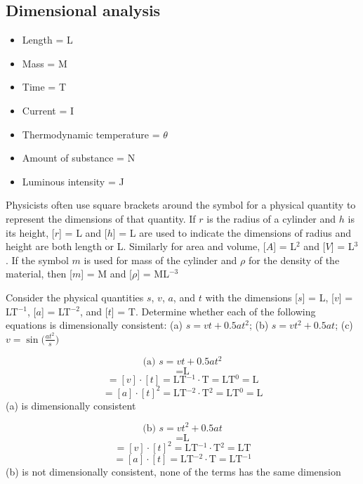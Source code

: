 \documentclass[a4paper]{article}
\begin{document}
    \subsection{Dimensional analysis}

    \begin{itemize}
        \item Length = L
        \item Mass = M
        \item Time = T
        \item Current = I
        \item Thermodynamic temperature = $\theta$
        \item Amount of substance = N
        \item Luminous intensity = J
    \end{itemize}
    Physicists often use square brackets around the symbol for a physical quantity to represent the dimensions of that quantity. If $r$ is the radius of a cylinder and $h$ is its height, [$r$] = L and [$h$] = L are used to indicate the dimensions of radius and height are both length or L. Similarly for area and volume, [$A$] = L$^2$ and [$V$] = L$^3$. If the symbol $m$ is used for mass of the cylinder and $\rho$ for the density of the material, then [$m$] = M and [$\rho$] = ML$^{-3}$

    Consider the physical quantities $s$, $v$, $a$, and $t$ with the dimensions [$s$] = L, [$v$] = LT$^{-1}$, [$a$] = LT$^{-2}$, and [$t$] = T. Determine whether each of the following equations is dimensionally consistent: (a) $s = vt + 0.5at^2$; (b) $s = vt^2 + 0.5at$; (c) $v = \sin\big(\frac{at^2}{s}\big)$

    \begin{equation}
        \text{(a) } s = vt + 0.5at^2
    \end{equation}
    \begin{equation}
        [s] = \text{L}
    \end{equation}
    \begin{equation}
        [vt] = [v] \cdot [t] = \text{LT$^{-1}$} \cdot \text{T} = \text{LT$^0$} = \text{L}
    \end{equation}
    \begin{equation}
        [0.5at^2] = [a] \cdot [t]^2 = \text{LT$^{-2}$} \cdot \text{T$^2$} = \text{LT$^0$} = \text{L}
    \end{equation}
    (a) is dimensionally consistent

    \begin{equation}
        \text{(b) } s = vt^2 + 0.5at
    \end{equation}
    \begin{equation}
        [s] = \text{L}
    \end{equation}
    \begin{equation}
        [vt^2] = [v] \cdot [t]^2 = \text{LT$^{-1}$} \cdot \text{T$^2$} = \text{LT}
    \end{equation}
    \begin{equation}
        [0.5at] = [a] \cdot [t] = \text{LT$^{-2}$} \cdot \text{T} = \text{LT$^{-1}$}
    \end{equation}
    (b) is not dimensionally consistent, none of the terms has the same dimension
\end{document}
